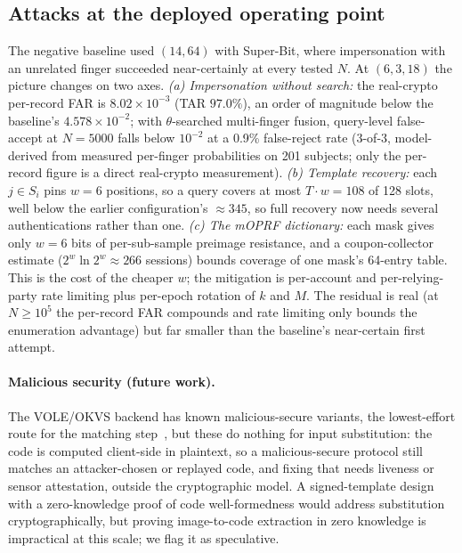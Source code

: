 \subsection{Attacks at the deployed operating point}
\label{sec:attacks}

The negative baseline used $(14,64)$ with Super-Bit, where impersonation with an unrelated finger
succeeded near-certainly at every tested $N$. At $(6,3,18)$ the picture changes on two axes.
\emph{(a) Impersonation without search:} the real-crypto per-record FAR is $8.02\times10^{-3}$ (TAR
$97.0\%$), an order of magnitude below the baseline's $4.578\times10^{-2}$; with $\theta$-searched
multi-finger fusion, query-level false-accept at $N=5000$ falls below $10^{-2}$ at a 0.9\%
false-reject rate (3-of-3, model-derived from measured per-finger probabilities on 201 subjects; only
the per-record figure is a direct real-crypto measurement). \emph{(b) Template recovery:} each
$j \in S_i$ pins $w=6$ positions, so a query covers at most $T\cdot w = 108$ of 128 slots, well below
the earlier configuration's $\approx345$, so full recovery now needs several authentications rather than
one. \emph{(c) The mOPRF dictionary:} each mask gives only $w=6$ bits of per-sub-sample preimage
resistance, and a coupon-collector estimate ($2^{w}\ln 2^{w} \approx 266$ sessions) bounds coverage of
one mask's 64-entry table. This is the cost of the cheaper $w$; the mitigation is per-account and
per-relying-party rate limiting plus per-epoch rotation of $k$ and $M$. The residual is real (at
$N\ge10^5$ the per-record FAR compounds and rate limiting only bounds the enumeration advantage) but
far smaller than the baseline's near-certain first attempt.

\paragraph{Malicious security (future work).}\label{sec:future} The VOLE/OKVS backend has known malicious-secure
variants, the lowest-effort route for the matching
step~\cite{RindalSchoppmann21}, but these do nothing for input substitution: the
code is computed client-side in plaintext, so a malicious-secure protocol still matches an
attacker-chosen or replayed code, and fixing that needs liveness or sensor attestation, outside the
cryptographic model. A signed-template design with a zero-knowledge proof of code well-formedness would
address substitution cryptographically, but proving image-to-code extraction in zero knowledge is
impractical at this scale; we flag it as speculative.
